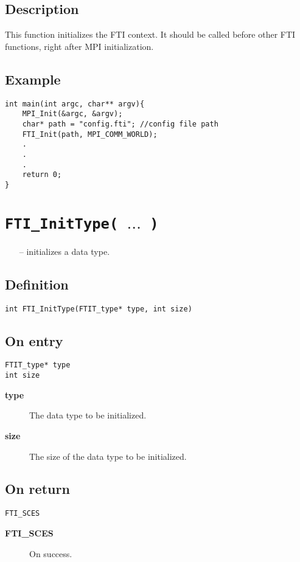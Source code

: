 \documentclass{refrep}
\begin{document}
\subsection*{Description}
This function initializes the FTI context. It should be called before other FTI functions, right after MPI initialization.
\subsection*{Example}
\begin{center}
\begin{lstlisting}[frame=single]
int main(int argc, char** argv){
    MPI_Init(&argc, &argv);
    char* path = "config.fti"; //config file path
    FTI_Init(path, MPI_COMM_WORLD);
    .
    .
    .
    return 0;
}
\end{lstlisting}
\end{center}
\newpage
\section{\tt FTI\_InitType( $\dots$ )}\label{sec:ftiinittype}
\begin{framed}
\begin{itemize}
\item[--] initializes a data type.
\end{itemize}
\end{framed}
\subsection*{Definition}
\begin{lstlisting}[frame=single]
int FTI_InitType(FTIT_type* type, int size)
\end{lstlisting}
\subsection*{On entry}
\begin{lstlisting}[frame=single]
FTIT_type* type
int size
\end{lstlisting}
\begin{description}
\item[\textbf{type}] The data type to be initialized.
\item[\textbf{size}] The size of the data type to be initialized.
\end{description}
\subsection*{On return}
\begin{lstlisting}[frame=single]
FTI_SCES
\end{lstlisting}
\begin{description}
\item[\textbf{FTI\_SCES}] On success.
\end{description}
\end{document}
